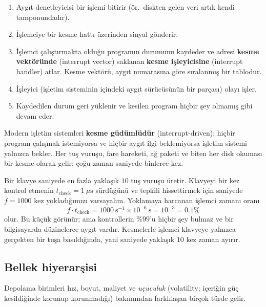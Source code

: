 \documentclass[11pt,a4paper]{article}
\newcommand{\term}[1]{\textbf{\color{mintdeep}#1}}
\begin{document}
\begin{enumerate}[leftmargin=1.4em]
  \item Aygıt denetleyicisi bir işlemi bitirir (ör.\ diskten gelen veri artık kendi tamponundadır).
  \item İşlemciye bir kesme hattı üzerinden sinyal gönderir.
  \item İşlemci çalıştırmakta olduğu programın durumunu kaydeder ve adresi \term{kesme vektöründe} (interrupt vector) saklanan \term{kesme işleyicisine} (interrupt handler) atlar. Kesme vektörü, aygıt numarasına göre sıralanmış bir tablodur.
  \item İşleyici (işletim sisteminin içindeki aygıt sürücüsünün bir parçası) olayı işler.
  \item Kaydedilen durum geri yüklenir ve kesilen program hiçbir şey olmamış gibi devam eder.
\end{enumerate}

Modern işletim sistemleri \textbf{kesme güdümlüdür} (interrupt-driven): hiçbir program çalışmak istemiyorsa ve hiçbir aygıt ilgi beklemiyorsa işletim sistemi yalnızca bekler. Her tuş vuruşu, fare hareketi, ağ paketi ve biten her disk okuması bir kesme olarak gelir; çoğu zaman saniyede binlerce kez.

\begin{example}
Bir klavye saniyede en fazla yaklaşık $10$ tuş vuruşu üretir. Klavyeyi bir kez kontrol etmenin $t_{\text{check}} = 1\ \mu\text{s}$ sürdüğünü ve tepkili hissettirmek için saniyede $f = 1000$ kez yokladığımızı varsayalım. Yoklamaya harcanan işlemci zamanı oranı
\[
f \cdot t_{\text{check}} = 1000\ \text{s}^{-1} \times 10^{-6}\ \text{s} = 10^{-3} = 0.1\%
\]
olur. Bu küçük görünür; ama kontrollerin $\%99$'u hiçbir şey bulmaz ve bir bilgisayarda düzinelerce aygıt vardır. Kesmelerle işlemci klavyeye yalnızca gerçekten bir tuşa basıldığında, yani saniyede yaklaşık $10$ kez zaman ayırır.
\end{example}

\subsection{Bellek hiyerarşisi}

Depolama birimleri hız, boyut, maliyet ve \emph{uçuculuk} (volatility; içeriğin güç kesildiğinde korunup korunmadığı) bakımından farklılaşan birçok türde gelir.
\end{document}
